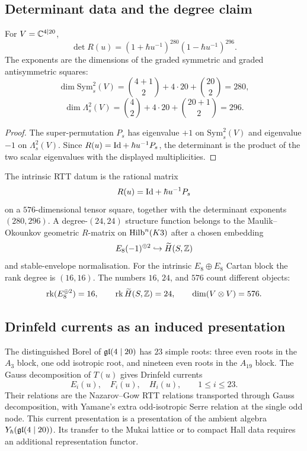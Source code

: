\subsection*{Determinant data and the degree claim}

\begin{lemma}
\label{lem:rtt-determinant-exponents}
For \(V=\mathbb{C}^{4\mid 20}\),
\[
  \det R(u)
  =
  (1+\hbar u^{-1})^{280}(1-\hbar u^{-1})^{296}.
\]
The exponents are the dimensions of the graded symmetric and graded
antisymmetric squares:
\[
  \dim \mathrm{Sym}^2_s(V)=
  \binom{4+1}{2}+4\cdot 20+\binom{20}{2}=280,
\]
\[
  \dim \Lambda^2_s(V)=
  \binom{4}{2}+4\cdot 20+\binom{20+1}{2}=296 .
\]
\end{lemma}

\begin{proof}
The super-permutation \(P_s\) has eigenvalue \(+1\) on
\(\mathrm{Sym}^2_s(V)\) and eigenvalue \(-1\) on
\(\Lambda^2_s(V)\).  Since \(R(u)=\mathrm{Id}+\hbar u^{-1}P_s\), the determinant
is the product of the two scalar eigenvalues with the displayed
multiplicities.
\end{proof}

The intrinsic RTT datum is the rational matrix
\[
  R(u)=\mathrm{Id}+\hbar u^{-1}P_s
\]
on a \(576\)-dimensional tensor square, together with the determinant
exponents \((280,296)\).  A degree-\((24,24)\) structure function
belongs to the Maulik--Okounkov geometric \(R\)-matrix on
\(\mathrm{Hilb}^n(K3)\) after a chosen embedding
\[
  E_8(-1)^{\oplus 2}\hookrightarrow \widetilde H(S,\mathbb{Z})
\]
and stable-envelope normalisation.  For the intrinsic
\(E_8\oplus E_8\) Cartan block the rank degree is \((16,16)\).  The
numbers \(16\), \(24\), and \(576\) count different objects:
\[
  \mathrm{rk}(E_8^{\oplus 2})=16,\qquad
  \mathrm{rk}\,\widetilde H(S,\mathbb{Z})=24,\qquad
  \dim(V\otimes V)=576 .
\]

\subsection*{Drinfeld currents as an induced presentation}

The distinguished Borel of \(\mathfrak{gl}(4\mid 20)\) has \(23\) simple roots:
three even roots in the \(A_3\) block, one odd isotropic root, and
nineteen even roots in the \(A_{19}\) block.  The Gauss decomposition
of \(T(u)\) gives Drinfeld currents
\[
  E_i(u),\quad F_i(u),\quad H_i(u),
  \qquad 1\leq i\leq 23.
\]
Their relations are the Nazarov--Gow RTT relations transported through
Gauss decomposition, with Yamane's extra odd-isotropic Serre relation
at the single odd node.  This current presentation is a presentation
of the ambient algebra \(Y_\hbar(\mathfrak{gl}(4\mid 20))\).  Its transfer to
the Mukai lattice or to compact Hall data requires an additional
representation functor.

